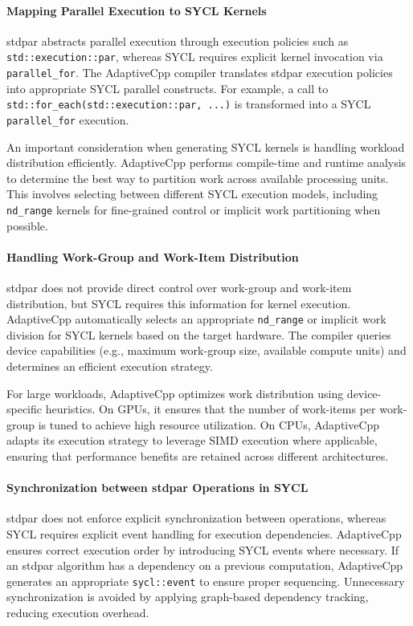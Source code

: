 \paragraph{Mapping Parallel Execution to SYCL Kernels}
stdpar abstracts parallel execution through execution policies such as \texttt{std::execution::par}, whereas
SYCL requires explicit kernel invocation via \texttt{parallel\_for}. The AdaptiveCpp compiler translates
stdpar execution policies into appropriate SYCL parallel constructs. For example, a call to \\
\texttt{std::for\_each(std::execution::par, ...)} is transformed into a SYCL \texttt{parallel\_for} execution.

An important consideration when generating SYCL kernels is handling workload distribution efficiently.
AdaptiveCpp performs compile-time and runtime analysis to determine the best way to partition work
across available processing units. This involves selecting between different SYCL execution models,
including \texttt{nd\_range} kernels for fine-grained control or implicit work partitioning when possible.

\paragraph{Handling Work-Group and Work-Item Distribution}
stdpar does not provide direct control over work-group and work-item distribution, but SYCL requires this
information for kernel execution. AdaptiveCpp automatically selects an appropriate \texttt{nd\_range} or
implicit work division for SYCL kernels based on the target hardware. The compiler queries device capabilities
(e.g., maximum work-group size, available compute units) and determines an efficient execution strategy.

For large workloads, AdaptiveCpp optimizes work distribution using device-specific heuristics. On GPUs,
it ensures that the number of work-items per work-group is tuned to achieve high resource utilization.
On CPUs, AdaptiveCpp adapts its execution strategy to leverage SIMD execution where applicable, ensuring
that performance benefits are retained across different architectures.

\paragraph{Synchronization between stdpar Operations in SYCL}
stdpar does not enforce explicit synchronization between operations, whereas SYCL requires explicit event
handling for execution dependencies. AdaptiveCpp ensures correct execution order by introducing SYCL events
where necessary. If an stdpar algorithm has a dependency on a previous computation, AdaptiveCpp generates an
appropriate \texttt{sycl::event} to ensure proper sequencing. Unnecessary synchronization is avoided by applying
graph-based dependency tracking, reducing execution overhead.

